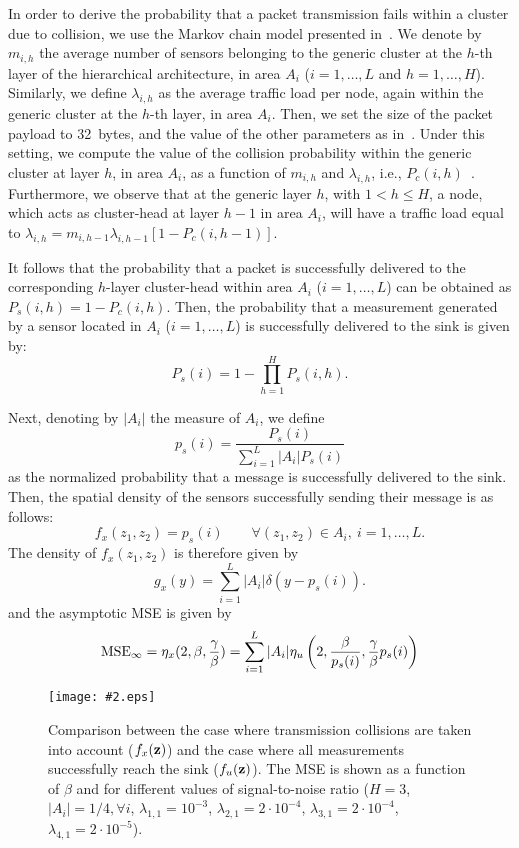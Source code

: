 \documentclass[11pt, draftcls, onecolumn, a4paper]{IEEEtran}
\newcommand{\insertfig}[4]{
\begin{figure}[ht]
\centerline{\texttt{[image: \#2.eps]}}
\caption{#3}\label{#4}\end{figure}}
\newcommand{\zv}{{\bf z}}
\def\MSEinf{{\rm MSE}_{\infty}}
\begin{document}
In order to derive the probability that a packet transmission fails within
a cluster due
to collision, we use the Markov chain  model presented in~\cite{collision}.
We denote by $m_{i,h}$ the average number of sensors belonging to the generic
cluster at the $h$-th layer of the hierarchical architecture, in area $A_i$
($i=1,\ldots,L$ and $h=1,\ldots,H$). 
Similarly, we define $\lambda_{i,h}$ as the average traffic load per node, 
again within the generic cluster at the $h$-th layer, in area $A_i$. 
Then, we set the size of the packet payload to 32~bytes, 
and  the value of the other parameters as in~\cite{collision}. 
Under this setting, 
we compute the value of the collision probability within
the generic cluster at layer $h$, in area $A_i$, 
as a function of $m_{i,h}$ and  $\lambda_{i,h}$, i.e., 
$P_c(i,h)$~\cite{collision}. 
Furthermore, we observe that at the generic layer $h$, with $1<h\leq H$, 
a node, which acts as cluster-head  at layer $h-1$ in area $A_i$, will
have a traffic load equal to 
$\lambda_{i,h}=m_{i,h-1}\lambda_{i,h-1} \left [1-P_c(i,h-1)\right ]$.

It follows that the probability that a packet 
is successfully delivered to the corresponding $h$-layer cluster-head 
within area $A_i$ ($i=1,\ldots,L$) can be obtained as 
$P_s(i,h)=1-P_c(i,h)$.
Then, the probability that a measurement generated
by a sensor located in $A_i$ ($i=1,\ldots,L$) is successfully 
delivered to the sink is given by: 
\[
P_s(i)=1-\prod_{h=1}^H P_s(i,h)  .
\]

Next, denoting by $|A_i|$ the measure of $A_i$, we define 
\[ p_s(i) = \frac{P_s(i)}{\sum_{i=1}^L |A_i| P_s(i)} \]
as the normalized probability that a message is successfully
delivered to the sink. Then, the spatial density of the sensors successfully
sending their message is as follows:
\[  
f_{x}(z_1,z_2) = p_s(i) \quad \quad \forall (z_1,z_2)\in A_i,~i=1,\ldots,L .
\]
The density of $f_{x}(z_1,z_2)$ is therefore given by
\[ g_{x}(y) = \sum_{i=1}^L |A_i|\delta\left(y-p_s(i)\right) .\]
and the asymptotic MSE is given by
\[ \MSEinf = \eta_x(2,\beta,\frac{\gamma}{\beta}) = 
\sum_{i=1}^L |A_i|\eta_u\left(2,\frac{\beta}{p_s(i)},\frac{\gamma}{\beta} p_s(i) \right) \]


\insertfig{0.8}{lambda2}{Comparison between the case where transmission
collisions are taken into account ($f_x(\zv)$) and the case where all measurements successfully
reach the sink ($f_u(\zv)$). The MSE is shown as a function of $\beta$ and for different values of signal-to-noise ratio ($H=3$, $|A_i|=1/4, \forall i$, 
$\lambda_{1,1} =10^{-3}$, $\lambda_{2,1}=2\cdot 10^{-4}$, $\lambda_{3,1} =2\cdot 10^{-4}$, $\lambda_{4,1}=2\cdot 10^{-5}$).}{fig:lambda2}
\end{document}
